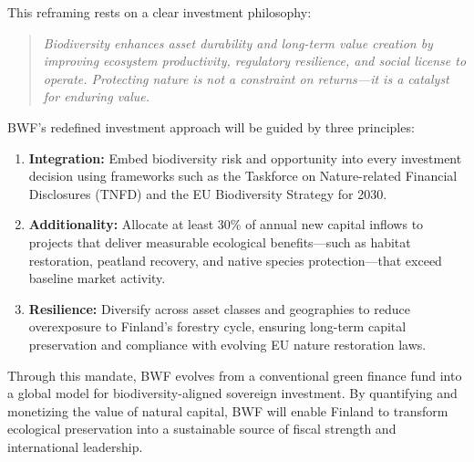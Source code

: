 This reframing rests on a clear investment philosophy:

\begin{quote}
\emph{Biodiversity enhances asset durability and long-term value creation by improving ecosystem productivity, regulatory resilience, and social license to operate. Protecting nature is not a constraint on returns—it is a catalyst for enduring value.}
\end{quote}

BWF’s redefined investment approach will be guided by three principles:
\begin{enumerate}[label=\textbf{\arabic*.}]
    \item \textbf{Integration:} Embed biodiversity risk and opportunity into every investment decision using frameworks such as the Taskforce on Nature-related Financial Disclosures (TNFD) and the EU Biodiversity Strategy for 2030.
    \item \textbf{Additionality:} Allocate at least 30\% of annual new capital inflows to projects that deliver measurable ecological benefits—such as habitat restoration, peatland recovery, and native species protection—that exceed baseline market activity.
    \item \textbf{Resilience:} Diversify across asset classes and geographies to reduce overexposure to Finland’s forestry cycle, ensuring long-term capital preservation and compliance with evolving EU nature restoration laws.
\end{enumerate}

Through this mandate, BWF evolves from a conventional green finance fund into a global model for biodiversity-aligned sovereign investment. By quantifying and monetizing the value of natural capital, BWF will enable Finland to transform ecological preservation into a sustainable source of fiscal strength and international leadership.